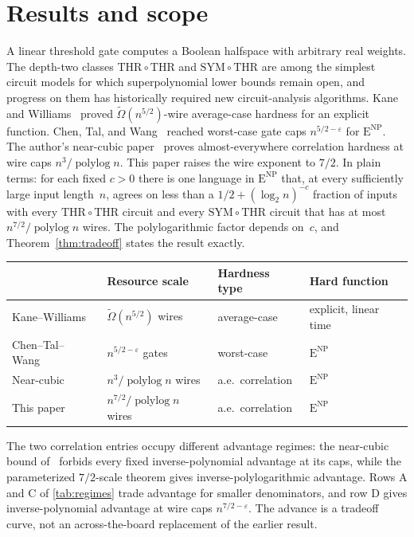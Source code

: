 \documentclass[11pt,letterpaper]{article}
\theoremstyle{definition}
\theoremstyle{remark}
\newcommand{\THR}{\mathrm{THR}}
\newcommand{\SYM}{\mathrm{SYM}}
\newcommand{\ENP}{\mathrm{E}^{\mathrm{NP}}}
\newcommand{\polylog}{\operatorname{polylog}}
\begin{document}
\medskip
{\small\setcounter{tocdepth}{1}\tableofcontents}
\clearpage

\section{Results and scope}
\label{sec:results}

A linear threshold gate computes a Boolean halfspace with arbitrary
real weights. The depth-two classes $\THR\circ\THR$ and
$\SYM\circ\THR$ are among the simplest circuit models for which
superpolynomial lower bounds remain open, and progress on them has
historically required new circuit-analysis algorithms. Kane and
Williams~\cite{KaneWilliams} proved $\widetilde\Omega(n^{5/2})$-wire
average-case hardness for an explicit function. Chen, Tal, and
Wang~\cite{CTW} reached worst-case gate caps $n^{5/2-\varepsilon}$
for $\ENP$. The author's near-cubic paper~\cite{NagCubic} proves
almost-everywhere correlation hardness at wire caps $n^3/\polylog n$.
This paper raises the wire exponent to $7/2$. In plain terms: for each
fixed $c>0$ there is one language in $\ENP$ that, at every sufficiently
large input length~$n$, agrees on less than a $1/2+(\log_2n)^{-c}$
fraction of inputs with every $\THR\circ\THR$ circuit and every
$\SYM\circ\THR$ circuit that has at most $n^{7/2}/\polylog n$ wires.
The polylogarithmic factor depends on~$c$, and
Theorem~\ref{thm:tradeoff} states the result exactly.

\begin{center}
\small
\begin{tabular}{@{}llll@{}}
\toprule
 & Resource scale & Hardness type & Hard function\\
\midrule
Kane--Williams~\cite{KaneWilliams} & $\widetilde\Omega(n^{5/2})$ wires & average-case & explicit, linear time\\
Chen--Tal--Wang~\cite{CTW} & $n^{5/2-\varepsilon}$ gates & worst-case & $\ENP$\\
Near-cubic~\cite{NagCubic} & $n^{3}/\polylog n$ wires & a.e.\ correlation & $\ENP$\\
This paper & $n^{7/2}/\polylog n$ wires & a.e.\ correlation & $\ENP$\\
\bottomrule
\end{tabular}\par
\end{center}

The two correlation entries occupy different advantage regimes: the
near-cubic bound of~\cite{NagCubic} forbids
every fixed inverse-polynomial advantage at its caps, while the parameterized $7/2$-scale theorem gives
inverse-polylogarithmic advantage. Rows A and C of \cref{tab:regimes}
trade advantage for smaller denominators, and row D gives
inverse-polynomial advantage at wire caps $n^{7/2-\varepsilon}$.
The advance is a tradeoff curve, not an across-the-board replacement
of the earlier result.
\end{document}
